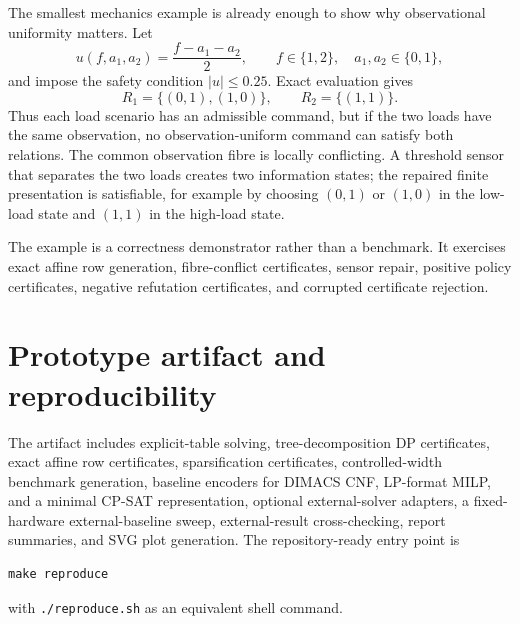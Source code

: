 \documentclass[11pt]{article}
\theoremstyle{plain}
\theoremstyle{definition}
\theoremstyle{remark}
\begin{document}
The smallest mechanics example is already enough to show why observational
uniformity matters.  Let
\[
  u(f,a_1,a_2)=\frac{f-a_1-a_2}{2},
  \qquad f\in\{1,2\},\quad a_1,a_2\in\{0,1\},
\]
and impose the safety condition \(|u|\le 0.25\).  Exact evaluation gives
\[
  R_1=\{(0,1),(1,0)\},
  \qquad
  R_2=\{(1,1)\}.
\]
Thus each load scenario has an admissible command, but if the two loads have the
same observation, no observation-uniform command can satisfy both relations.
The common observation fibre is locally conflicting.  A threshold sensor that
separates the two loads creates two information states; the repaired finite
presentation is satisfiable, for example by choosing \((0,1)\) or \((1,0)\) in
the low-load state and \((1,1)\) in the high-load state.

The example is a correctness demonstrator rather than a benchmark.  It exercises
exact affine row generation, fibre-conflict certificates, sensor repair,
positive policy certificates, negative refutation certificates, and corrupted
certificate rejection.

\section{Prototype artifact and reproducibility}
\label{sec:artifact}

The artifact includes explicit-table solving, tree-decomposition DP
certificates, exact affine row certificates, sparsification certificates,
controlled-width benchmark generation, baseline encoders for DIMACS CNF,
LP-format MILP, and a minimal CP-SAT representation, optional
external-solver adapters, a fixed-hardware external-baseline sweep,
external-result cross-checking, report summaries, and SVG plot generation.
The repository-ready entry point is
\begin{verbatim}
make reproduce
\end{verbatim}
with \texttt{./reproduce.sh} as an equivalent shell command.
\end{document}
